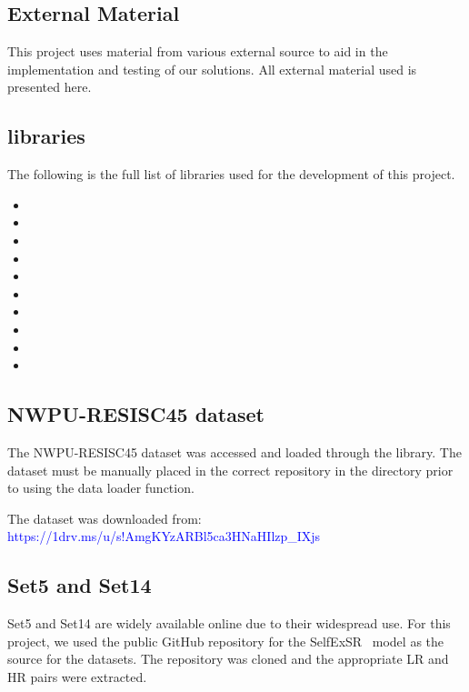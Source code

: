 \begin{appendices}
\chapter{External Material}\label{app:external_material}
This project uses material from various external source to aid in the implementation and testing of our solutions. All external material used is presented here.

\section{ libraries}
The following is the full list of  libraries used for the development of this project.
\begin{itemize}
    \item {}
    \item {}
    \item {}
    \item {}
    \item {}
    \item {}
    \item {}
    \item {}
    \item {}
    \item {}
\end{itemize}

\section{NWPU-RESISC45 dataset}
The NWPU-RESISC45 dataset was accessed and loaded through the  library. The dataset must be manually placed in the correct repository in the  directory prior to using the data loader function. 

The dataset was downloaded from: \textcolor{blue}{https://1drv.ms/u/s!AmgKYzARBl5ca3HNaHIlzp\_IXjs}

\section{Set5 and Set14}
Set5 and Set14 are widely available online due to their widespread use. For this project, we used the public GitHub repository for the SelfExSR~\cite{selfexsr} model as the source for the datasets. The repository was cloned and the appropriate LR and HR pairs were extracted.


\end{appendices}
